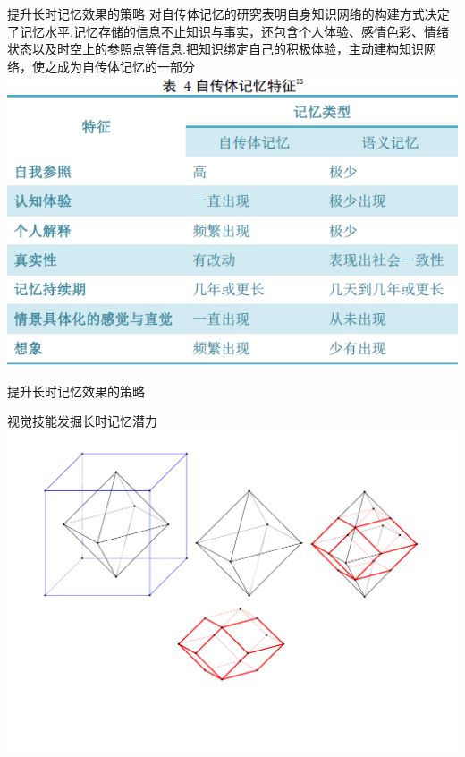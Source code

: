 \documentclass[serif]{beamer}
\begin{document}
        \begin{frame}{提升长时记忆效果的策略}
        对自传体记忆的研究表明自身知识网络的构建方式决定了记忆水平.记忆存储的信息不止知识与事实，还包含个人体验、感情色彩、情绪状态以及时空上的参照点等信息.把知识绑定自己的积极体验，主动建构知识网络，使之成为自传体记忆的一部分\\
        \includegraphics[scale=0.5]{autobiography1.png}
        \end{frame}
        
        \begin{frame}{提升长时记忆效果的策略}
        \begin{block}{视觉技能发掘长时记忆潜力}
        	\includegraphics[scale=0.32]{prism.pdf}
        \end{block}
        \end{frame}
        
\end{document}
